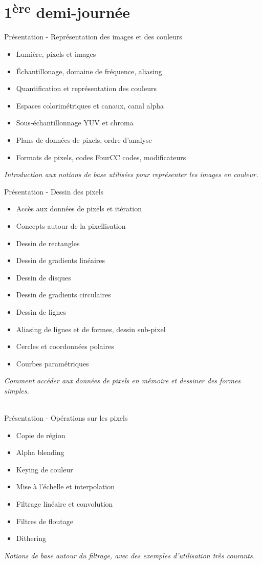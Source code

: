 \documentclass[a4paper,12pt,obeyspaces,spaces,hyphens]{article}
\begin{document}
\section{1\textsuperscript{ère} demi-journée}

\feagendatwocolumn
{Présentation - Représentation des images et des couleurs}
{
  \begin{itemize}
  \item Lumière, pixels et images
  \item Échantillonage, domaine de fréquence, aliasing
  \item Quantification et représentation des couleurs
  \item Espaces colorimétriques et canaux, canal alpha
  \item Sous-échantillonnage YUV et chroma
  \item Plans de données de pixels, ordre d'analyse
  \item Formats de pixels, codes FourCC codes, modificateurs
  \end{itemize}
  \vspace{0.5em}
  {\em Introduction aux notions de base utilisées pour représenter les images en couleur.}
}
{Présentation - Dessin des pixels}
{
  \begin{itemize}
  \item Accès aux données de pixels et itération
  \item Concepts autour de la pixellisation
  \item Dessin de rectangles
  \item Dessin de gradients linéaires
  \item Dessin de disques
  \item Dessin de gradients circulaires
  \item Dessin de lignes
  \item Aliasing de lignes et de formes, dessin sub-pixel
  \item Cercles et coordonnées polaires
  \item Courbes paramétriques
  \end{itemize}
  \vspace{0.5em}
  {\em Comment accéder aux données de pixels en mémoire et dessiner des formes simples.}
}
\\
\feagendatwocolumn
{Présentation - Opérations sur les pixels}
{
  \begin{itemize}
  \item Copie de région
  \item Alpha blending
  \item Keying de couleur
  \item Mise à l'échelle et interpolation
  \item Filtrage linéaire et convolution
  \item Filtres de floutage
  \item Dithering
  \end{itemize}
  \vspace{0.5em}
  {\em Notions de base autour du filtrage, avec des exemples d'utilisation très courants.}
}
\end{document}
